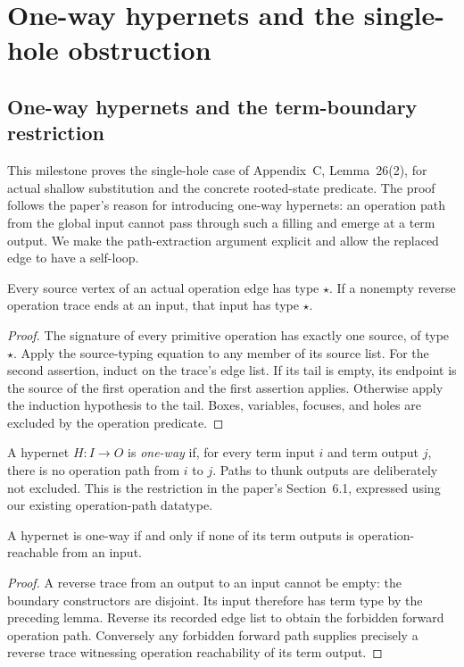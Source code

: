 \section{One-way hypernets and the single-hole obstruction}
\label{sec:one-way-section}

\subsection{One-way hypernets and the term-boundary restriction}
\label{sec:one-way}
This milestone proves the single-hole case of Appendix~C, Lemma~26(2), for
actual shallow substitution and the concrete rooted-state predicate. The
proof follows the paper's reason for introducing one-way hypernets: an
operation path from the global input cannot pass through such a filling and
emerge at a term output. We make the path-extraction argument explicit and
allow the replaced edge to have a self-loop.

\begin{lemma}
Every source vertex of an actual operation edge has type $\star$. If a
nonempty reverse operation trace ends at an input, that input has type
$\star$.
\end{lemma}
\begin{proof}
The signature of every primitive operation has exactly one source, of type
$\star$. Apply the source-typing equation to any member of its source list.
For the second assertion, induct on the trace's edge list. If its tail is
empty, its endpoint is the source of the first operation and the first
assertion applies. Otherwise apply the induction hypothesis to the tail.
Boxes, variables, focuses, and holes are excluded by the operation predicate.
\end{proof}

\begin{definition}\label{term:one-way}
A hypernet $H:I\to O$ is \emph{one-way} if, for every term input $i$ and term
output $j$, there is no operation path from $i$ to $j$. Paths to thunk outputs
are deliberately not excluded. This is the restriction in the paper's
Section~6.1, expressed using our existing operation-path datatype.
\end{definition}

\begin{theorem}
A hypernet is one-way if and only if none of its term outputs is
operation-reachable from an input.
\end{theorem}
\begin{proof}
A reverse trace from an output to an input cannot be empty: the boundary
constructors are disjoint. Its input therefore has term type by the preceding
lemma. Reverse its recorded edge list to obtain the forbidden forward
operation path. Conversely any forbidden forward path supplies precisely a
reverse trace witnessing operation reachability of its term output.
\end{proof}

